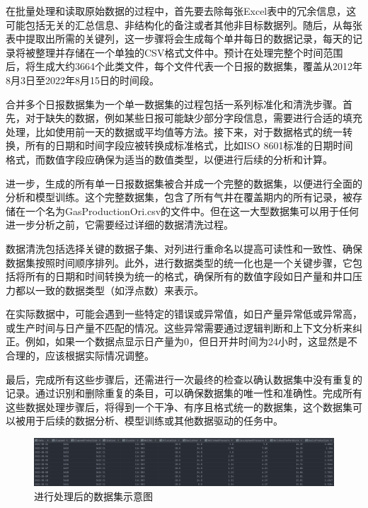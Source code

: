 在批量处理和读取原始数据的过程中，首先要去除每张Excel表中的冗余信息，这可能包括无关的汇总信息、非结构化的备注或者其他非目标数据列。随后，从每张表中提取出所需的关键列，这一步骤将会生成每个单井每日的数据记录，每天的记录将被整理并存储在一个单独的CSV格式文件中。预计在处理完整个时间范围后，将生成大约3664个此类文件，每个文件代表一个日报的数据集，覆盖从2012年8月3日至2022年8月15日的时间段。

合并多个日报数据集为一个单一数据集的过程包括一系列标准化和清洗步骤。首先，对于缺失的数据，例如某些日报可能缺少部分字段信息，需要进行合适的填充处理，比如使用前一天的数据或平均值等方法。接下来，对于数据格式的统一转换，所有的日期和时间字段应被转换成标准格式，比如ISO 8601标准的日期时间格式，而数值字段应确保为适当的数值类型，以便进行后续的分析和计算。

进一步，生成的所有单一日报数据集被合并成一个完整的数据集，以便进行全面的分析和模型训练。这个完整数据集，包含了所有气井在覆盖期内的所有记录，被存储在一个名为GasProductionOri.csv的文件中。但在这一大型数据集可以用于任何进一步分析之前，它需要经过详细的数据清洗过程。

数据清洗包括选择关键的数据子集、对列进行重命名以提高可读性和一致性、确保数据集按照时间顺序排列。此外，进行数据类型的统一化也是一个关键步骤，它包括将所有的日期和时间转换为统一的格式，确保所有的数值字段如日产量和井口压力都以一致的数据类型（如浮点数）来表示。

在实际数据中，可能会遇到一些特定的错误或异常值，如日产量异常低或异常高，或生产时间与日产量不匹配的情况。这些异常需要通过逻辑判断和上下文分析来纠正。例如，如果一个数据点显示日产量为0，但日开井时间为24小时，这显然是不合理的，应该根据实际情况调整。

最后，完成所有这些步骤后，还需进行一次最终的检查以确认数据集中没有重复的记录。通过识别和删除重复的条目，可以确保数据集的唯一性和准确性。完成所有这些数据处理步骤后，将得到一个干净、有序且格式统一的数据集，这个数据集可以被用于后续的数据分析、模型训练或其他数据驱动的任务中。
\begin{figure}[H]
    \centering
    \includegraphics{figure/afterprocessdata.png}
    \caption{进行处理后的数据集示意图}
    \label{fig:afterprocess}
\end{figure}

